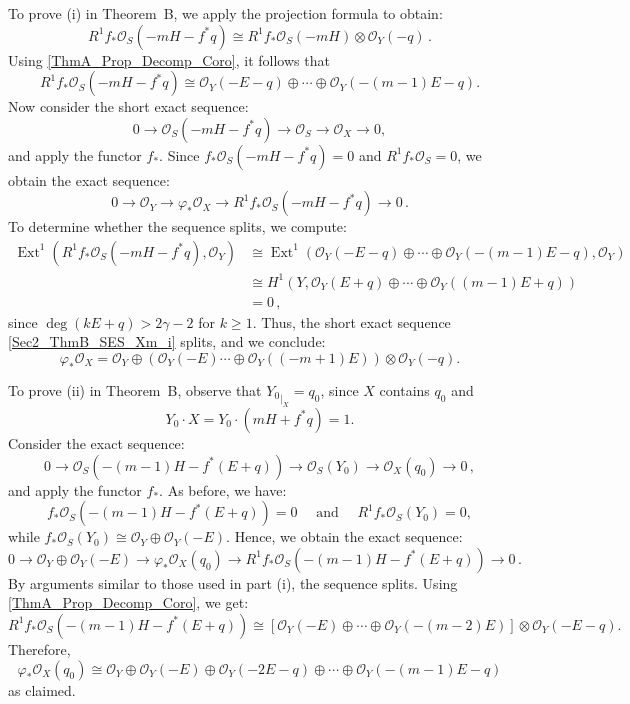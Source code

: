 \documentclass[a4paper,12pt]{amsart}
\def\Ext{\operatorname{Ext}}%
\begin{document}
To prove \textnormal{(i)} in \textnormal{Theorem~B}, we apply the projection formula \cite[Ex.~III.8.3, p.~253]{Hart77} to obtain:
\[
 R^1 f_{\ast} \mathcal{O}_S (-mH - f^{\ast}q) \cong R^1 f_{\ast} \mathcal{O}_S (-mH) \otimes \mathcal{O}_Y (-q) \, .
\]
Using \eqref{ThmA_Prop_Decomp_Coro}, it follows that
\[
 R^1 f_{\ast} \mathcal{O}_S (-mH - f^{\ast}q) \cong \mathcal{O}_Y (-E-q) \oplus \cdots \oplus \mathcal{O}_Y (-(m-1)E-q) .
\]
Now consider the short exact sequence:
\[
 0 \to \mathcal{O}_S (-mH-f^{\ast}q) \to \mathcal{O}_S \to \mathcal{O}_X \to 0 ,
\]
and apply the functor $f_{\ast}$. Since $f_{\ast} \mathcal{O}_S (-mH-f^{\ast}q) = 0$ and $R^1 f_{\ast} \mathcal{O}_S = 0$, we obtain the exact sequence:
\begin{equation}\label{Sec2_ThmB_SES_Xm_i}
 0 \to \mathcal{O}_Y \to \varphi_{\ast} \mathcal{O}_X \to R^1 f_{\ast} \mathcal{O}_S (-mH-f^{\ast}q) \to 0 \, .
\end{equation}
To determine whether the sequence splits, we compute:
\[
\begin{aligned}
 \Ext^1 (R^1 f_{\ast} \mathcal{O}_S (-mH-f^{\ast}q), \mathcal{O}_Y)
 & \cong \Ext^1 (\mathcal{O}_Y (-E-q) \oplus \cdots \oplus \mathcal{O}_Y (-(m-1)E-q), \mathcal{O}_Y) \\ & \cong H^1 (Y, \mathcal{O}_Y (E+q) \oplus \cdots \oplus \mathcal{O}_Y ((m-1)E+q)) \\
 & = 0 \, ,
\end{aligned}
\]
since $\deg (kE + q) > 2\gamma - 2$ for $k \geq 1$. Thus, the short exact sequence \eqref{Sec2_ThmB_SES_Xm_i} splits, and we conclude:
\[
 \varphi_{\ast} \mathcal{O}_X =  \mathcal{O}_Y \oplus \left(\mathcal{O}_Y (-E) \cdots \oplus \mathcal{O}_Y ((-m+1)E) \right) \otimes \mathcal{O}_Y (-q) .
\]

To prove \textnormal{(ii)} in \textnormal{Theorem~B}, observe that ${Y_0}_{|_X} = q_0$, since $X$ contains $q_0$ and
\[
 Y_0 \cdot X = Y_0 \cdot (mH + f^{\ast} q) = 1 .
\]
Consider the exact sequence:
\[
 0 \to \mathcal{O}_S (-(m-1)H-f^{\ast}(E+q)) \to \mathcal{O}_S (Y_0) \to \mathcal{O}_X (q_0) \to 0 \, ,
\]
and apply the functor $f_{\ast}$. As before, we have:
\[
 f_{\ast}\mathcal{O}_S (-(m-1)H-f^{\ast}(E+q)) = 0 \quad \mbox{ and } \quad R^1 f_{\ast}\mathcal{O}_S (Y_0) = 0 ,
\]
while $f_{\ast}\mathcal{O}_S (Y_0) \cong \mathcal{O}_Y \oplus \mathcal{O}_Y (-E)$. Hence, we obtain the exact sequence:
\[
  0 \to \mathcal{O}_Y \oplus \mathcal{O}_Y (-E) \to \varphi_{\ast} \mathcal{O}_X (q_0) \to R^1 f_{\ast} \mathcal{O}_S (-(m-1)H-f^{\ast}(E+q)) \to 0 \, .
\]
By arguments similar to those used in part \textnormal{(i)}, the sequence splits. Using \eqref{ThmA_Prop_Decomp_Coro}, we get:
\[
 R^1 f_{\ast} \mathcal{O}_S (-(m-1)H-f^{\ast}(E+q)) \cong \left[ \mathcal{O}_Y (-E) \oplus \cdots \oplus \mathcal{O}_Y (-(m-2)E) \right] \otimes \mathcal{O}_Y (-E-q) .
\]
Therefore,
\[
 \varphi_{\ast} \mathcal{O}_X (q_0) \cong \mathcal{O}_Y \oplus \mathcal{O}_Y (-E) \oplus  \mathcal{O}_Y (-2E-q) \oplus \cdots \oplus \mathcal{O}_Y (-(m-1)E-q)
\]
as claimed.
\end{document}

